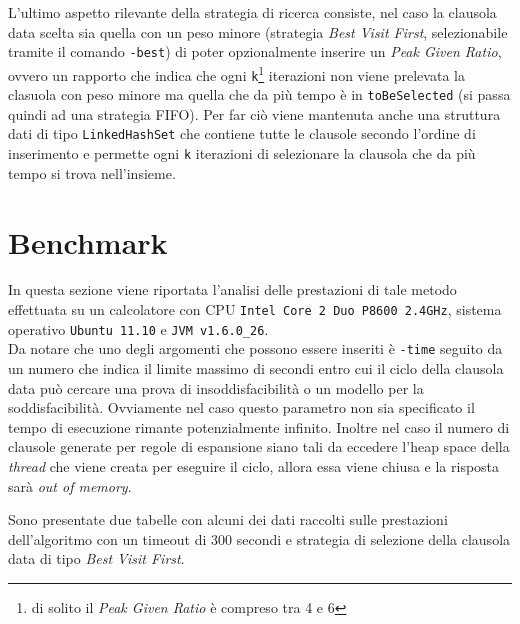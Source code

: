\documentclass[a4paper,11pt]{article}
\begin{document}
L'ultimo aspetto rilevante della strategia di ricerca consiste, nel caso la clausola data scelta sia quella con un peso minore (strategia \emph{Best Visit First}, selezionabile tramite il comando \texttt{-best}) di poter opzionalmente inserire un \emph{Peak Given Ratio}, ovvero un rapporto che indica che ogni \texttt{k}\footnote{di solito il \emph{Peak Given Ratio} è compreso tra 4 e 6} iterazioni non viene prelevata la clasuola con peso minore ma quella che da più tempo è in \texttt{toBeSelected} (si passa quindi ad una strategia FIFO). Per far ciò viene mantenuta anche una struttura dati di tipo \texttt{LinkedHashSet} che contiene tutte le clausole secondo l'ordine di inserimento e permette ogni \texttt{k} iterazioni di selezionare la clausola che da più tempo si trova nell'insieme.

\section{Benchmark}
In questa sezione viene riportata l'analisi delle prestazioni di tale metodo effettuata su un calcolatore con CPU \texttt{Intel Core 2 Duo P8600 2.4GHz}, sistema operativo \texttt{Ubuntu 11.10} e \texttt{JVM v1.6.0\_26}.\\
Da notare che uno degli argomenti che possono essere inseriti è \texttt{-time} seguito da un numero che indica il limite massimo di secondi entro cui il ciclo della clausola data può cercare una prova di insoddisfacibilità o un modello per la soddisfacibilità. Ovviamente nel caso questo parametro non sia specificato il tempo di esecuzione rimante potenzialmente infinito. Inoltre nel caso il numero di clausole generate per regole di espansione siano tali da eccedere l'heap space della \emph{thread} che viene creata per eseguire il ciclo, allora essa viene chiusa e la risposta sarà \emph{out of memory}.\par
Sono presentate due tabelle con alcuni dei dati raccolti sulle prestazioni dell'algoritmo con un timeout di 300 secondi e  strategia di selezione della clausola data di tipo \emph{Best Visit First}.
\end{document}
